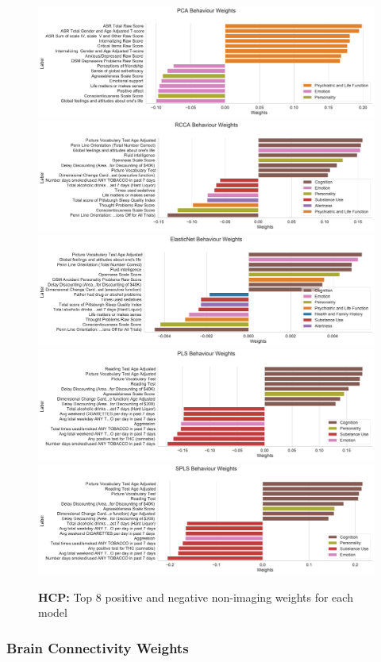 \begin{figure}[h]
    \centering
    \includegraphics[width=0.8\linewidth]{figures/hcp/PCA behaviour weights}
    \includegraphics[width=0.8\linewidth]{figures/hcp/RCCA behaviour weights}
    \includegraphics[width=0.8\linewidth]{figures/hcp/ElasticNet behaviour weights}
    \includegraphics[width=0.8\linewidth]{figures/hcp/PLS behaviour weights}
    \includegraphics[width=0.8\linewidth]{figures/hcp/SPLS behaviour weights}
    \caption{\textbf{HCP:} Top 8 positive and negative non-imaging \gls{weights} for each model}\label{fig:behaviour}
\end{figure}

\subsubsection{Brain Connectivity Weights}


